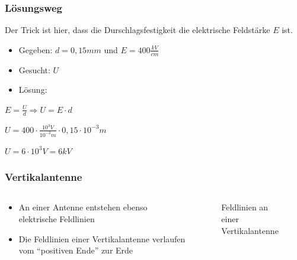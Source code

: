 \begin{frame}
\frametitle{Lösungsweg}
Der Trick ist hier, dass die Durschlagsfestigkeit die elektrische Feldstärke $E$ ist.

\begin{itemize}
  \item Gegeben: $d = 0,15mm$ und $E = 400\frac{kV}{cm}$
  \item Gesucht: $U$
  \item Lösung:
  \end{itemize}
$E = \frac{U}{d} \Rightarrow U = E\cdot d$

$U = 400\cdot\frac{10^3V}{10^{-2}m}\cdot 0,15\cdot 10^{-3}m$

$U = 6\cdot10^3V = 6kV$

\end{frame}

\begin{frame}
\frametitle{Vertikalantenne}
\begin{columns}
    \begin{column}{0.48\textwidth}
    \begin{itemize}
  \item An einer Antenne entstehen ebenso elektrische Feldlinien
  \item Die Feldlinien einer Vertikalantenne verlaufen vom \enquote{positiven Ende} zur Erde
  \end{itemize}

    \end{column}
   \begin{column}{0.48\textwidth}
       
\begin{figure}
    \caption{\scriptsize Feldlinien an einer Vertikalantenne}
    \label{e_feldlinien_vertikalantenne}
\end{figure}


   \end{column}
\end{columns}

\end{frame}

\begin{frame}
\end{frame}%
